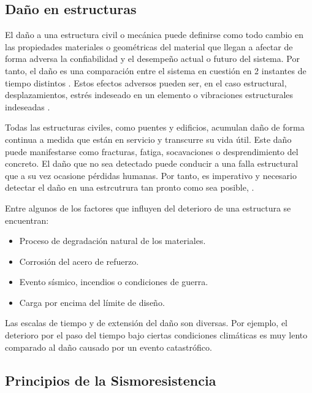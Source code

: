 

\subsection{Daño en estructuras}

El daño a una estructura civil o mecánica puede definirse como todo cambio en las propiedades materiales o geométricas del material que llegan a afectar de forma adversa la confiabilidad y el desempeño actual o futuro del sistema. Por tanto, el daño es una comparación entre el sistema en cuestión en 2 instantes de tiempo distintos \citep{farrar2007introduction}. Estos efectos adversos pueden ser, en el caso estructural, desplazamientos, estrés indeseado en un elemento o vibraciones estructurales indeseadas \citep{chen2018}.

Todas las estructuras civiles, como puentes y edificios, acumulan daño de forma continua a medida que están en servicio y transcurre su vida útil. Este daño puede manifestarse como fracturas, fatiga, socavaciones o desprendimiento del concreto. El daño que no sea detectado puede conducir a una falla estructural que a su vez ocasione pérdidas humanas. Por tanto, es imperativo y necesario detectar el daño en una estrcutrura tan pronto como sea posible, \citep{chen2018}.

Entre algunos de los factores que influyen del deterioro de una estructura se encuentran:
    
        \begin{itemize}
            \item Proceso de degradación natural de los materiales.
            \item Corrosión del acero de refuerzo.
            \item Evento sísmico, incendios o condiciones de guerra.
            \item Carga por encima del límite de diseño.
        \end{itemize}
    
Las escalas de tiempo y de extensión del daño son diversas. Por ejemplo, el deterioro por el paso del tiempo bajo ciertas condiciones climáticas es muy lento comparado al daño causado por un evento catastrófico.

\subsection{Principios de la Sismoresistencia}

